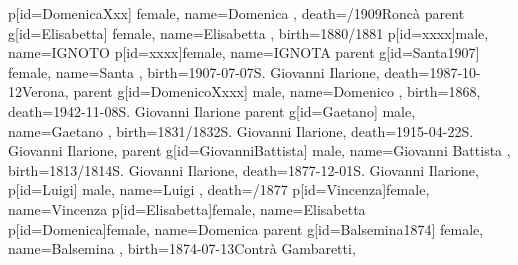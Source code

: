 \documentclass{article}
\begin{document}
\begin{midpage}
\begin{center}
\begin{genealogypicture}
{{{{{{{                        }
                        p[id=DomenicaXxx]{
                            female,
                            name={Domenica },
                            death={/1909}{Roncà}
                        }
                    }
                }
                parent{
                    g[id=Elisabetta]{
                        female,
                        name={Elisabetta },
                        birth={1880/1881}{}
                    }
                    p[id=xxxx]{male, name={IGNOTO}}
                    p[id=xxxx]{female, name={IGNOTA}}
                }
            }
            parent{
                g[id=Santa1907]{
                    female,
                    name={Santa },
                    birth={1907-07-07}{S. Giovanni Ilarione},
                    death={1987-10-12}{Verona},
                }
                parent{
                    g[id=DomenicoXxxx]{
                        male,
                        name={Domenico },
                        birth={1868}{},
                        death={1942-11-08}{S. Giovanni Ilarione}
                    }
                    parent{
                        g[id=Gaetano]{
                            male,
                            name={Gaetano },
                            birth={1831/1832}{S. Giovanni Ilarione},
                            death={1915-04-22}{S. Giovanni Ilarione},
                        }
                        parent{
                            g[id=GiovanniBattista]{
                                male,
                                name={Giovanni Battista },
                                birth={1813/1814}{S. Giovanni Ilarione},
                                death={1877-12-01}{S. Giovanni Ilarione},
                            }
                            p[id=Luigi]{
                                male,
                                name={Luigi },
                                death={/1877}{}
                            }
                            p[id=Vincenza]{female, name={Vincenza }}
                        }
                        p[id=Elisabetta]{female, name={Elisabetta }}
                    }
                    p[id=Domenica]{female, name={Domenica }}
                }
                parent{
                    g[id=Balsemina1874]{
                        female,
                        name={Balsemina },
                        birth={1874-07-13}{Contrà Gambaretti},
}}}}}}
\end{genealogypicture}
\end{center}
\end{midpage}
\end{document}
